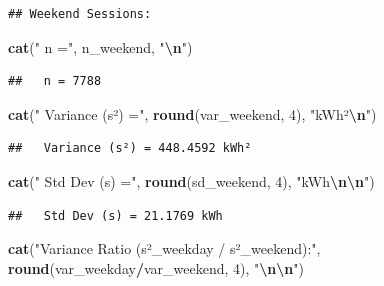 \documentclass[
  12pt,
]{article}
\newenvironment{Shaded}{\begin{snugshade}}{\end{snugshade}}
\newcommand{\DecValTok}[1]{\textcolor[rgb]{0.00,0.00,0.81}{#1}}
\newcommand{\FunctionTok}[1]{\textcolor[rgb]{0.13,0.29,0.53}{\textbf{#1}}}
\newcommand{\NormalTok}[1]{#1}
\newcommand{\SpecialCharTok}[1]{\textcolor[rgb]{0.81,0.36,0.00}{\textbf{#1}}}
\newcommand{\StringTok}[1]{\textcolor[rgb]{0.31,0.60,0.02}{#1}}
\begin{document}
\begin{verbatim}
## Weekend Sessions:
\end{verbatim}

\begin{Shaded}
\begin{Highlighting}[]
\FunctionTok{cat}\NormalTok{(}\StringTok{"  n ="}\NormalTok{, n\_weekend, }\StringTok{"}\SpecialCharTok{\textbackslash{}n}\StringTok{"}\NormalTok{)}
\end{Highlighting}
\end{Shaded}

\begin{verbatim}
##   n = 7788
\end{verbatim}

\begin{Shaded}
\begin{Highlighting}[]
\FunctionTok{cat}\NormalTok{(}\StringTok{"  Variance (s²) ="}\NormalTok{, }\FunctionTok{round}\NormalTok{(var\_weekend, }\DecValTok{4}\NormalTok{), }\StringTok{"kWh²}\SpecialCharTok{\textbackslash{}n}\StringTok{"}\NormalTok{)}
\end{Highlighting}
\end{Shaded}

\begin{verbatim}
##   Variance (s²) = 448.4592 kWh²
\end{verbatim}

\begin{Shaded}
\begin{Highlighting}[]
\FunctionTok{cat}\NormalTok{(}\StringTok{"  Std Dev (s) ="}\NormalTok{, }\FunctionTok{round}\NormalTok{(sd\_weekend, }\DecValTok{4}\NormalTok{), }\StringTok{"kWh}\SpecialCharTok{\textbackslash{}n\textbackslash{}n}\StringTok{"}\NormalTok{)}
\end{Highlighting}
\end{Shaded}

\begin{verbatim}
##   Std Dev (s) = 21.1769 kWh
\end{verbatim}

\begin{Shaded}
\begin{Highlighting}[]
\FunctionTok{cat}\NormalTok{(}\StringTok{"Variance Ratio (s²\_weekday / s²\_weekend):"}\NormalTok{, }\FunctionTok{round}\NormalTok{(var\_weekday}\SpecialCharTok{/}\NormalTok{var\_weekend,}
    \DecValTok{4}\NormalTok{), }\StringTok{"}\SpecialCharTok{\textbackslash{}n\textbackslash{}n}\StringTok{"}\NormalTok{)}
\end{Highlighting}
\end{Shaded}
\end{document}
